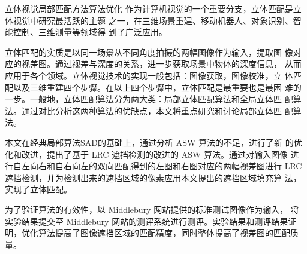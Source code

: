 \begin{Cabstract}{立体视觉}{局部匹配方法}{算法优化}{}{}
作为计算机视觉的一个重要分支，立体匹配是立体视觉中研究最活跃的主题
之一，在三维场景重建、移动机器人、对象识别、智能控制、三维测量等领域得
到了广泛应用。 

立体匹配的实质是以同一场景从不同角度拍摄的两幅图像作为输入，提取图
像对应的视差图。通过视差与深度的关系，进一步获取场景中物体的深度信息，
从而应用于各个领域。立体视觉技术的实现一般包括：图像获取，图像校准，立
体匹配以及三维重建四个步骤。在以上四个步骤中，立体匹配是最重要也是最困
难的一步。一般地，立体匹配算法分为两大类：局部立体匹配算法和全局立体匹
配算法。通过对比分析这两种算法的优缺点，本文将重点研究和讨论局部立体匹
配算法。

本文在经典局部算法SAD的基础上，通过分析 ASW 算法的不足，进行了新
的优化和改进，提出了基于 LRC 遮挡检测的改进的 ASW 算法。通过对输入图像
进行自左向右和自右向左的双向匹配得到的左图和右图对应的两幅视差图进行
LRC 遮挡检测，并为检测出来的遮挡区域的像素应用本文提出的遮挡区域填充算
法，实现了立体匹配。 

为了验证算法的有效性，以 Middlebury 网站提供的标准测试图像作为输入，
将实验结果提交至 Middlebury 网站的测评系统进行测评。实验结果和测评结果证
明，优化算法提高了图像遮挡区域的匹配精度，同时整体提高了视差图的匹配质量。
\end{Cabstract}

